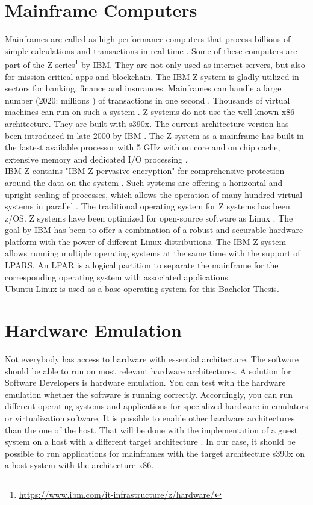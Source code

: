 \section{Mainframe Computers}

Mainframes are called as high-performance computers that process billions of simple calculations and transactions in real-time \cite{IBM}. Some of these computers are part of the Z series\footnote{\url{https://www.ibm.com/it-infrastructure/z/hardware/}} by IBM. They are not only used as internet servers, but also for mission-critical apps and blockchain. 
The IBM Z system is gladly utilized in sectors for banking, finance and insurances.
Mainframes can handle a large number (2020: millions \cite{IBM2}) of transactions in one second \cite[~p.56]{Tanenbaum2014}. 
Thousands of virtual machines can run on such a system \cite{OpenMainframeProject}. \gls{Z systems} do not use the well known x86 architecture. 
They are built with s390x. The current architecture version has been introduced in late 2000 by IBM \cite[~p.15]{Block2019}. The Z system as a mainframe has built in the fastest available processor with 5 GHz with on core and on chip cache, extensive memory and dedicated I/O processing \cite{OpenMainframeProject}.
\\
IBM Z contains "IBM Z pervasive encryption" for comprehensive protection around the data on the system \cite[~p.4]{Lascu2020}. Such systems are offering a horizontal and upright \gls{scaling} of processes, which allows the operation of many hundred virtual systems in parallel \cite[~p.13]{Tschoeke2009}. The traditional operating system for Z systems has been z/OS. 
Z systems have been optimized for open-source software as Linux \cite[~p.8]{Lascu2020}. The goal by IBM has been to offer a combination of a robust and securable hardware platform with the power of different Linux distributions. 
The IBM Z system allows running multiple operating systems at the same time with the support of LPARS.
An \gls{LPAR} is a logical partition to separate the mainframe for the corresponding operating system with associated applications. \\
Ubuntu Linux is used as a base operating system for this Bachelor Thesis.


\section{Hardware Emulation}

Not everybody has access to hardware with essential architecture. The software should be able to run on most relevant hardware architectures. A solution for Software Developers is hardware emulation. 
You can test with the hardware emulation whether the software is running correctly. 
Accordingly, you can run different operating systems and applications for specialized hardware in emulators or virtualization software. 
It is possible to enable other hardware architectures than the one of the host. 
That will be done with the implementation of a guest system on a host with a different target architecture \cite[~p.3]{Rosenthal2015}. In our case, it should be possible to run applications for mainframes with the target
architecture s390x on a host system with the architecture x86.


